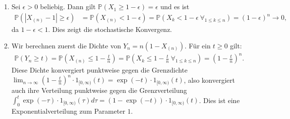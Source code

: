 \documentclass[a4paper]{article}
\begin{document}
\subsection{}


\subsection{}

\begin{enumerate}
    \item Sei $\epsilon > 0$ beliebig. Dann gilt $\mathds{P}(X_1 \geq 1 - \epsilon) = \epsilon$ und es ist 
    \begin{align*}
        \mathds{P}(|X_{(n)} - 1| \geq \epsilon) &= \mathds{P}(X_{(n)} < 1 - \epsilon ) = \mathds{P}(X_k < 1 - \epsilon \ \forall_{1 \leq k \leq n}) = (1 - \epsilon)^n \to 0\text{,}
    \end{align*}
    da $1-\epsilon < 1$. Dies zeigt die stochastische Konvergenz.
    \item Wir berechnen zuerst die Dichte von $Y_n = n(1 - X_{(n)})$. Für ein $t \geq 0$ gilt:
    \begin{align*}
        \mathds{P}(Y_n \geq t) = \mathds{P}(X_{(n)} \leq 1 - \frac{t}{n}) = \mathds{P}(X_k \leq 1 - \frac{t}{n} \ \forall_{1 \leq k \leq n}) = (1 - \frac{t}{n})^n\text{.}
    \end{align*}
    Diese Dichte konvergiert punktweise gegen die Grenzdichte $\lim_{n \to \infty} (1 - \frac{t}{n})^n \cdot 1_{[0,\infty)}(t) = \exp(-t) \cdot 1_{[0, \infty)}(t)$, also konvergiert auch ihre Verteilung punktweise gegen die Grenzverteilung $\int_{0}^{t} \exp(-\tau) \cdot 1_{[0, \infty)}(\tau) d\tau = (1 - \exp(-t)) \cdot 1_{[0, \infty)}(t)$. Dies ist eine Exponentialverteilung zum Parameter $1$.
\end{enumerate}
\end{document}
